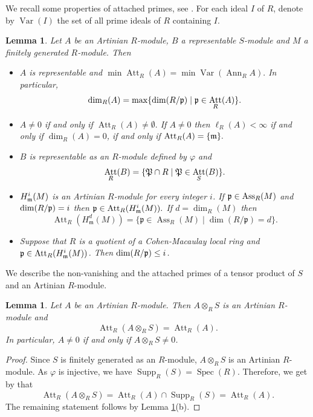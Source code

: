 \documentclass[a4papersize]{article}
\newtheorem{lemma}[theorem]{Lemma}
\DeclareMathOperator{\Ann}{Ann}
\DeclareMathOperator{\Ass}{Ass}
\DeclareMathOperator{\Supp}{Supp}
\DeclareMathOperator{\Var}{Var}
\DeclareMathOperator{\Att}{Att}
\DeclareMathOperator{\Spec}{Spec}
\begin{document}
{We recall some properties of attached primes, see \cite{BS, Mac, NDC}. For each ideal $I$ of $R$, denote by $\Var(I)$ the set of all prime ideals of $R$ containing $I.$ 		  
			 
\begin{lemma}\label{L:2}  Let $A$ be an Artinian $R$-module,  $B$ a representable $S$-module and $M$ a finitely generated $R$-module.  Then 
\begin{itemize}
\item [{\rm (a)}] $A$ is representable and $\min\Att_R(A)=\min\Var (\Ann_RA).$ In particular, $$\dim_R(A)=\max\{\dim(R/\frak p)\mid\frak p\in \Att_R(A)\}.$$
				
\item [{\rm (b)}] $A\neq 0$ if and only if $\Att_R(A)\neq \emptyset.$ If $A\neq 0$ then $\ell_R(A)<\infty$ if and only if $\dim_R(A)=0$,  if and only if $\Att_R(A)=\{\frak m\}.$ 
			
\item [{\rm (c)}]  $B$ is representable as an $R$-module defined by $\varphi$ and $$\Att_R(B)=\{\frak P\cap R\mid \frak P\in\Att_S(B)\}.$$
	 
\item [{\rm (d)}] $H^i_{\frak m}(M)$ is an Artinian $R$-module for every integer $i$.  If $\frak p\in\Ass_R(M)$ and $\dim (R/\frak p)=i$ then $\frak p\in\Att_R(H^i_{\frak m}(M)).$ If $d=\dim_R(M)$ then
$$\Att_R(H^d_{\mathfrak m}(M))=\{\mathfrak p \in \Ass_R(M) \mid \dim (R/\mathfrak p)=d\}.$$
	 	
\item [{\rm (e)}] Suppose that $R$ is a quotient of a Cohen-Macaulay local ring and $\frak p\in\Att_R(H^i_{\frak m}(M))$. Then $\dim(R/\frak p)\leq i$. 
\end{itemize}
\end{lemma}
			
We describe the non-vanishing and the attached primes of a tensor product of $S$ and an Artinian $R$-module. 
			
\begin{lemma}\label{L:2a} Let $A$ be an Artinian $R$-module. Then 
 $A\otimes_RS$ is an Artinian $R$-module and $$\Att_R(A\otimes_RS)=\Att_R(A).$$ In particular, $A\neq 0$ if and only if $A\otimes_RS\neq 0$.
\end{lemma}

\begin{proof} Since $S$ is finitely generated as an $R$-module,  $A\otimes_RS$ is an Artinian $R$-module. As $\varphi$ is injective, we have $\Supp_R(S)=\Spec(R).$ Therefore, we get  by \cite[Proposition 5.2]{MSch} that 
$$\Att_R(A\otimes_RS)=\Att_R(A)\cap \Supp_R(S)=\Att_R(A).$$
The remaining statement follows   by Lemma \ref{L:2}(b). 
\end{proof}			
			 
}
\end{document}
